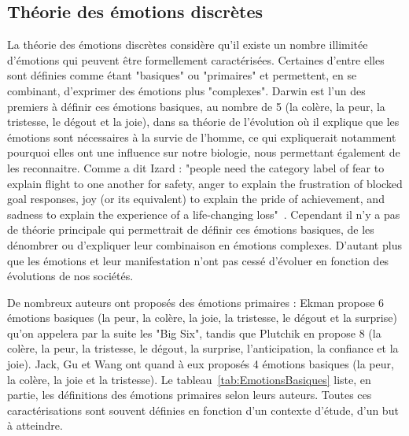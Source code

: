 \subsection{Théorie des émotions discrètes}
La théorie des émotions discrètes considère qu'il existe un nombre illimitée d'émotions qui peuvent être formellement caractérisées. Certaines d'entre elles sont définies comme étant "basiques" ou "primaires" et permettent, en se combinant, d'exprimer des émotions plus "complexes". Darwin est l'un des premiers à définir ces émotions basiques, au nombre de 5 (la colère, la peur, la tristesse, le dégout et la joie), dans sa théorie de l'évolution où il explique que les émotions sont nécessaires à la survie de l'homme, ce qui expliquerait notamment pourquoi elles ont une influence sur notre biologie, nous permettant également de les reconnaitre.
Comme a dit Izard : "people need the category label of fear to explain flight to one another for safety, anger to explain the frustration of blocked goal responses, joy (or its equivalent) to explain the pride of achievement, and sadness to explain the experience of a life-changing loss"~\cite{Izard2007}.
Cependant il n'y a pas de théorie principale qui permettrait de définir ces émotions basiques, de les dénombrer ou d'expliquer leur combinaison en émotions complexes. D'autant plus que les émotions et leur manifestation n'ont pas cessé d'évoluer en fonction des évolutions de nos sociétés.



De nombreux auteurs ont proposés des émotions primaires : Ekman propose 6 émotions basiques (la peur, la colère, la joie, la tristesse, le dégout et la surprise) qu'on appelera par la suite les "Big Six", tandis que Plutchik en propose 8 (la colère, la peur, la tristesse, le dégout, la surprise, l'anticipation, la confiance et la joie). Jack, Gu et Wang ont quand à eux proposés 4 émotions basiques (la peur, la colère, la joie et la tristesse). Le tableau~\ref{tab:EmotionsBasiques} liste, en partie, les définitions des émotions primaires selon leurs auteurs. Toutes ces caractérisations sont souvent définies en fonction d'un contexte d'étude, d'un but à atteindre.



